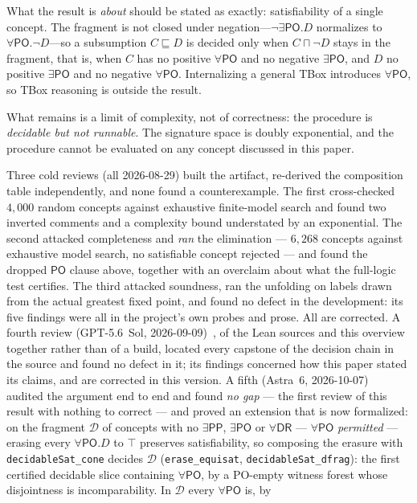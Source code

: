 \documentclass[11pt]{article}
\newcommand{\DR}{\mathsf{DR}}
\newcommand{\PO}{\mathsf{PO}}
\newcommand{\PP}{\mathsf{PP}}
\newcommand{\code}[1]{\texttt{#1}}
\theoremstyle{plain}
\theoremstyle{definition}
\begin{document}
What the result is \emph{about} should be stated as exactly: satisfiability of
a single concept. The fragment is not closed under negation---$\neg\exists\PO.D$
normalizes to $\forall\PO.\neg D$---so a subsumption $C\sqsubseteq D$ is decided
only when $C\sqcap\neg D$ stays in the fragment, that is, when $C$ has no
positive $\forall\PO$ and no negative $\exists\PO$, and $D$ no positive
$\exists\PO$ and no negative $\forall\PO$. Internalizing a general TBox
introduces $\forall\PO$, so TBox reasoning is outside the result.

What remains is a limit of complexity, not of correctness: the procedure is
\emph{decidable but not runnable}. The signature space is doubly exponential,
and the procedure cannot be evaluated on any concept discussed in this paper.

Three cold reviews (all 2026-08-29) built the artifact, re-derived the
composition table independently, and none found a counterexample. The first
cross-checked $4{,}000$ random concepts against exhaustive finite-model search
and found two inverted comments and a complexity bound understated by an
exponential. The second attacked completeness and \emph{ran} the elimination
--- $6{,}268$ concepts against exhaustive model search, no satisfiable concept
rejected --- and found the dropped $\PO$ clause above, together with an
overclaim about what the full-logic test certifies. The third attacked
soundness, ran the unfolding on labels drawn from the actual greatest fixed
point, and found no defect in the development: its five findings were all in the
project's own probes and prose. All are corrected. A fourth review
(GPT-5.6~Sol, 2026-09-09)~\cite{GPT56SolReview}, of the Lean sources and this
overview together rather than of a build, located every capstone of the
decision chain in the source and found no defect in it; its findings concerned
how this paper stated its claims, and are corrected in this version. A fifth
(Astra~6, 2026-10-07)~\cite{Astra6Review} audited the argument end to end and
found \emph{no gap} --- the first review of this result with nothing to
correct --- and proved an extension that is now formalized: on the fragment
$\mathcal D$ of concepts with no $\exists\PP$, $\exists\PO$ or $\forall\DR$
--- $\forall\PO$ \emph{permitted} --- erasing every $\forall\PO.D$ to $\top$
preserves satisfiability, so composing the erasure with
\code{decidableSat\_cone} decides $\mathcal D$
(\code{erase\_equisat}, \code{decidableSat\_dfrag}): the first certified
decidable slice containing $\forall\PO$, by a PO-empty witness forest whose
disjointness is incomparability. In $\mathcal D$ every $\forall\PO$ is, by
\end{document}
